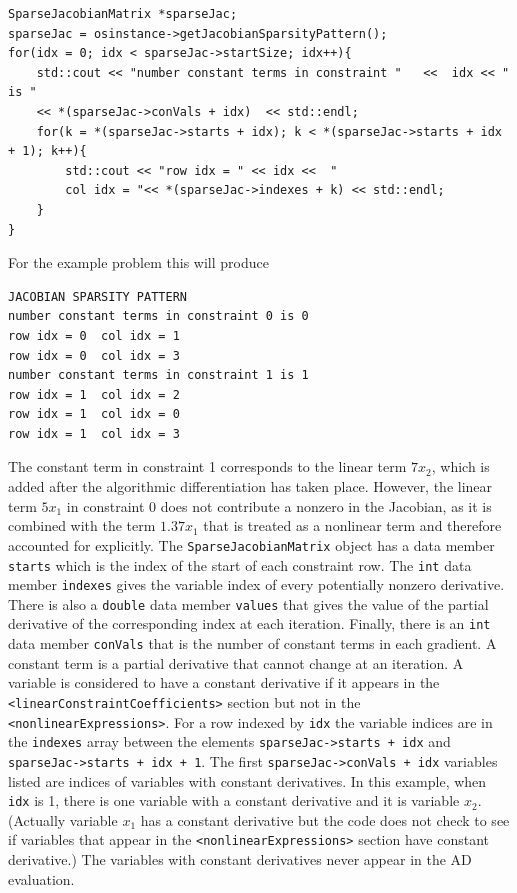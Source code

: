 \documentclass[11pt]{article}
\renewcommand{\_}{{\char"5F}}
\renewcommand{\{}{{\char"7B}}
\renewcommand{\}}{{\char"7D}}
\renewcommand{\^}{{\char"0D}}
\renewcommand{\'}{{\char"0D}}
\begin{document}
\begin{enumerate}[Step 1:]
\begin{verbatim}
SparseJacobianMatrix *sparseJac;
sparseJac = osinstance->getJacobianSparsityPattern();
for(idx = 0; idx < sparseJac->startSize; idx++){
    std::cout << "number constant terms in constraint "   <<  idx << " is "
    << *(sparseJac->conVals + idx)  << std::endl;
    for(k = *(sparseJac->starts + idx); k < *(sparseJac->starts + idx + 1); k++){
        std::cout << "row idx = " << idx <<  "
        col idx = "<< *(sparseJac->indexes + k) << std::endl;
    }
}
\end{verbatim}

For the example problem this will produce

\begin{verbatim}
JACOBIAN SPARSITY PATTERN
number constant terms in constraint 0 is 0
row idx = 0  col idx = 1
row idx = 0  col idx = 3
number constant terms in constraint 1 is 1
row idx = 1  col idx = 2
row idx = 1  col idx = 0
row idx = 1  col idx = 3
\end{verbatim}

The   constant term in constraint 1 corresponds to the linear term $7x_2$,
which is added after the algorithmic differentiation has taken place.
However, the linear  term $5x_1$ in constraint 0 does not
contribute a nonzero in the Jacobian, as it is combined with the
term $1.37x_1$ that is treated as a nonlinear term and
therefore accounted for explicitly.
The {\tt SparseJacobianMatrix} object has a data member {\tt starts}
which is the index of the start of each constraint row.
The {\tt int} data member {\tt indexes}  gives  the variable index
of every potentially nonzero derivative. There is also a {\tt double} data member
{\tt values} that gives the value of the partial derivative of the corresponding
index at each iteration. Finally, there is an {\tt int} data member
{\tt conVals} that is the number of constant terms in each gradient.
A constant term is a partial derivative that cannot change at an iteration.
A variable is considered to have a constant derivative
if it appears in the {\tt <linearConstraintCoefficients>} section
but not in the {\tt <nonlinearExpressions>}.  For a row indexed by {\tt idx}
the variable indices are in the  {\tt indexes} array between the elements
{\tt sparseJac->starts + idx} and {\tt sparseJac->starts + idx + 1}.
The first  {\tt sparseJac->conVals + idx} variables listed are indices
of  variables with constant derivatives. In this example, when {\tt idx} is 1,
there is one  variable with a constant derivative and it is variable $x_{2}$.
(Actually variable $x_{1}$ has a constant derivative but the code does not check
to see if variables that appear in the {\tt <nonlinearExpressions>} section
have constant derivative.) The  variables with constant derivatives
never appear in the AD evaluation.


\end{enumerate}
\end{document}
